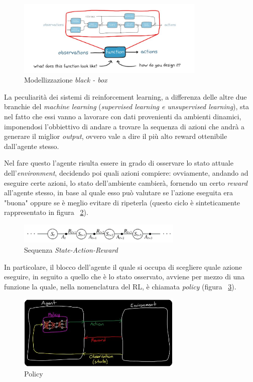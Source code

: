 \begin{figure}[h!]
	\centering
	\includegraphics[width=0.8\textwidth]{Immagini/SqueezingOfControlTheory.JPG}
	\caption{Modellizzazione \textit{black - box}}
	\label{fig:SqueezingOfControlTheory}
\end{figure}

La peculiarità dei sistemi di reinforcement learning, a differenza delle altre due branchie del \textit{machine learning} (\textit{supervised learning e unsupervised learning}), sta nel fatto che essi vanno a lavorare con dati provenienti da ambienti dinamici, imponendosi l'obbiettivo di andare a trovare la sequenza di azioni che andrà a generare il miglior \textit{output}, ovvero vale a dire il più alto reward ottenibile dall'agente stesso.


Nel fare questo l'agente risulta essere in grado di osservare lo stato attuale dell'\textit{environment}, decidendo poi quali azioni compiere: ovviamente, andando ad eseguire certe azioni, lo stato dell'ambiente cambierà, fornendo un certo \textit{reward} all'agente stesso, in base al quale esso può valutare se l'azione eseguita era "buona" oppure se è meglio evitare di ripeterla (questo ciclo è sinteticamente rappresentato in figura ~\ref{fig:State_Action_Reward}).

\begin{figure}[h]
	\centering
	\includegraphics[width=0.7\textwidth]{Immagini/State_Action_Reward.png}
	\caption{Sequenza \textit{State-Action-Reward}}
	\label{fig:State_Action_Reward}
\end{figure}

In particolare, il blocco dell'agente il quale si occupa di scegliere quale azione eseguire, in seguito a quello che è lo stato osservato, avviene per mezzo di una funzione la quale, nella nomenclatura del RL, è chiamata \textit{policy} (figura ~\ref{fig:Policy}).

\begin{figure}[!h]
	\centering
	\includegraphics[width=0.7\textwidth]{Immagini/Policy.JPG}
	\caption{Policy}
	\label{fig:Policy}
\end{figure}

